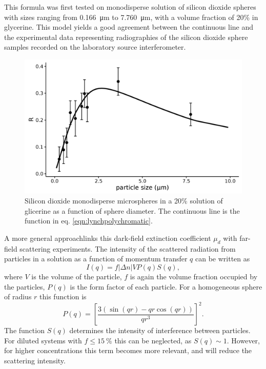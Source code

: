 This formula was first tested on monodisperse solution of silicon dioxide
spheres with sizes ranging from \SI{0.166}{\micro\meter} to
\SI{7.760}{\micro\meter}, with a volume fraction of 20\%
in glycerine. This model yields a good agreement between the continuous line
and the experimental data representing radiographies of the silicon dioxide
sphere samples recorded on the laboratory source interferometer.
\begin{figure}[h!]
\begin{center}
\includegraphics[width=0.70\columnwidth]{gfx/lung-paper-figures/summary/summary}
\caption{{Silicon dioxide monodisperse microspheres in a 20\% solution of
glicerine as a function of sphere diameter. The continuous line is the
function in eq. {\ref{eqn:lynchpolychromatic}}.
{\label{725462}}%
}}
\end{center}
\end{figure}

A more general approach\cn links this dark-field extinction coefficient
$\mu_d$ with far-field scattering experiments.
The intensity of the scattered radiation from particles in a solution as a function of momentum transfer $q$ can be written as\cn
\begin{equation}
    I(q) = f|\Delta n| V P(q) S(q),
    \label{eq:scattering.intensity}
\end{equation}
where $V$ is the volume of the particle, $f$ is again the volume fraction
occupied by the particles, $P(q)$ is the form factor of each particle. For a
homogeneous sphere of radius $r$ this function is\cn
\begin{equation}
    P(q) = \left[\frac{3(\sin(qr) - qr\cos(qr))}{qr^3}\right]^2.
    \label{eq:sphere.form.factor}
\end{equation}
The function $S(q)$ determines the intensity of interference between
particles. For diluted systems with $f \leq \SI{15}{\percent}$ this can
be neglected, as $S(q) \sim 1$. However, for higher concentrations this term
becomes more relevant, and will reduce the scattering intensity.

